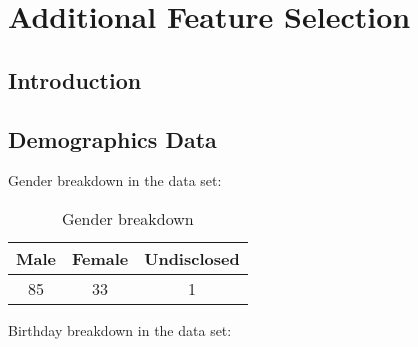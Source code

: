 
\chapter{Additional Feature Selection}
\label{cha:addfeatuers}

\section{Introduction}
\label{sec:AFintro}

\section{Demographics Data}
\label{sec:demo}

Gender breakdown in the data set:


\begin{table}[!htbp]
\centering
	\begin{tabular}{|c|c|c|} %
		\hline
		\textbf{Male} & \textbf{Female} & \textbf{Undisclosed}  \\ \hline
		85 & 33 & 1 \\ \hline
	\end{tabular}
	\caption{Gender breakdown}
	\label{tab:revpol}
\end{table}
\clearpage

Birthday breakdown in the data set:

